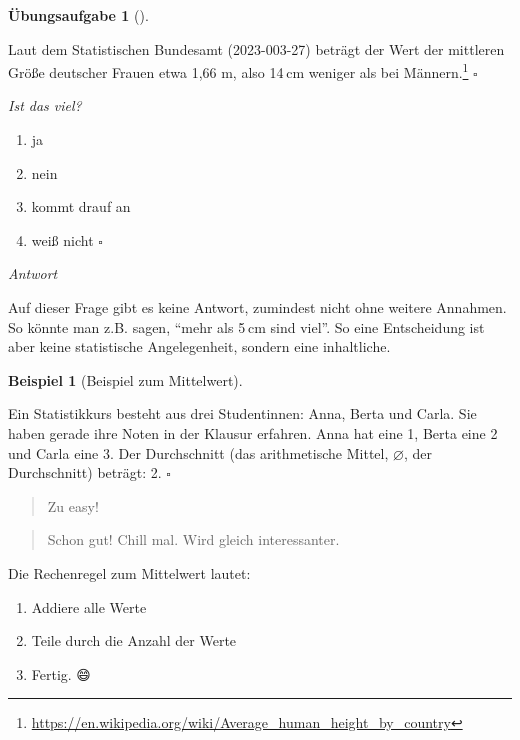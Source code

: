 \documentclass[
  letterpaper,
]{scrbook}
\providecommand{\tightlist}{%
  \setlength{\itemsep}{0pt}\setlength{\parskip}{0pt}}\usepackage{longtable,booktabs,array}
\theoremstyle{definition}
\newtheorem{exercise}{Übungsaufgabe}[chapter]
\theoremstyle{definition}
\newtheorem{example}{Beispiel}[chapter]
\theoremstyle{definition}
\theoremstyle{remark}
\begin{document}
\begin{exercise}[]\protect\hypertarget{exr-mw2}{}\label{exr-mw2}

Laut dem Statistischen Bundesamt (2023-003-27) beträgt der Wert der
mittleren Größe deutscher Frauen etwa 1,66 m, also 14 cm weniger als bei
Männern.\footnote{\url{https://en.wikipedia.org/wiki/Average_human_height_by_country}}
\(\square\)

\emph{Ist das viel?}

\begin{enumerate}
\def\labelenumi{\alph{enumi})}
\tightlist
\item
  ja
\item
  nein
\item
  kommt drauf an
\item
  weiß nicht \(\square\)
\end{enumerate}

\emph{Antwort}

Auf dieser Frage gibt es keine Antwort, zumindest nicht ohne weitere
Annahmen. So könnte man z.B. sagen, \enquote{mehr als 5 cm sind viel}.
So eine Entscheidung ist aber keine statistische Angelegenheit, sondern
eine inhaltliche.

\end{exercise}

\begin{example}[Beispiel zum
Mittelwert]\protect\hypertarget{exm-mw}{}\label{exm-mw}

Ein Statistikkurs besteht aus drei Studentinnen: Anna, Berta und Carla.
Sie haben gerade ihre Noten in der Klausur erfahren. Anna hat eine 1,
Berta eine 2 und Carla eine 3. Der Durchschnitt (das arithmetische
Mittel, \(\varnothing\), der Durchschnitt) beträgt: 2. \(\square\)

\end{example}

\begin{quote}
{} Zu easy!
\end{quote}

\begin{quote}
{} Schon gut! Chill mal. Wird gleich interessanter.
\end{quote}

Die Rechenregel zum Mittelwert lautet:

\begin{enumerate}
\def\labelenumi{\arabic{enumi}.}
\tightlist
\item
  Addiere alle Werte
\item
  Teile durch die Anzahl der Werte
\item
  Fertig. 😄
\end{enumerate}
\end{document}
